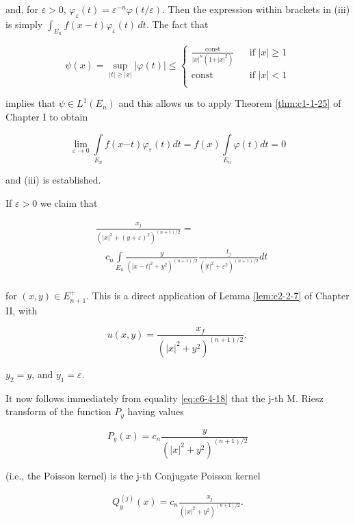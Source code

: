 and, for $\varepsilon > 0$, $\varphi_{\varepsilon}(t) = \varepsilon^{-n}\varphi(t/\varepsilon)$. Then the expression within brackets in (iii) is simply $\int_{E_n} f(x - t)\varphi_{\varepsilon}(t)\,dt$. The fact that

\[
\psi(x)=\sup_{|t|\geq|x|}\left|\varphi(t)\right|\leq\left\{\begin{matrix}{\displaystyle\frac{\text{const}}{\vert x\vert^{n}(1+\vert x\vert^{2})}}&{}&{\text{if }\vert x\vert\geq1}\\ {\text{const}}&{}&{\text{if }\vert x\vert<1}\\ \end{matrix}\right.
\]

implies that $\psi \in L^1(E_n)$ and this allows us to apply Theorem \ref{thm:c1-1-25} of Chapter I to obtain

\[
\lim_{\varepsilon\rightarrow0}\int\limits_{E_{n}}f(x\mathrm{ - }t)\varphi_{\varepsilon}(t)dt=f(x)\int\limits_{E_{n}}\varphi(t)dt=0
\]

and (iii) is established.

If $\varepsilon > 0$ we claim that

\begin{equation}\label{eq:c6-4-18}
\begin{aligned}&\frac{x_{j}}{(|x|^{2}+(y+\varepsilon)^{2})^{(n+1)/2}}=\\ &\quad c_{n}\int\limits_{E_{n}}\frac{y}{(|x-t|^{2}+y^{2})^{(n+1)/2}}\frac{t_{j}}{(|t|^{2}+\varepsilon^{2})^{(n+1)/2}}dt\\ \end{aligned}
\end{equation}

for $(x, y) \in E_{n+1}^+$. This is a direct application of Lemma \ref{lem:c2-2-7} of Chapter II, with

\[
u(x,y)=\frac{x_{f}}{(|x|^{2}+y^{2})^{(n+1)/2}},
\]

$y_2 = y$, and $y_1 = \varepsilon$.

It now follows immediately from equality \eqref{eq:c6-4-18} that the j-th M. Riesz transform of the function $P_{y}$ having values

\[
P_{y}(x)=c_{n}\frac{y}{\left(\left|x\right|^{2}+y^{2}\right)^{(n+1)/2}}
\]

(i.e., the Poisson kernel) is the j-th Conjugate Poisson kernel

\[
\begin{array}{r}{Q_{y}^{(j)}(x)=c_{n}\frac{x_{j}}{(|x|^{2}+y^{2})^{(n+1)/2}}.}\end{array}
\]

